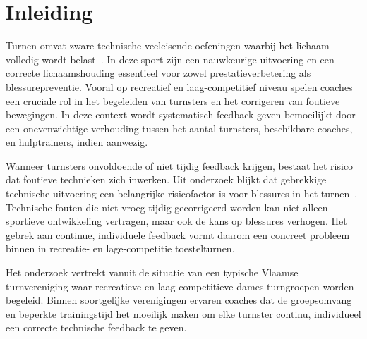 


% 

\section{Inleiding}%
\label{sec:inleiding}
Turnen omvat zware technische veeleisende oefeningen waarbij het lichaam volledig wordt belast~\autocite{ijms262210929}. In deze sport zijn een nauwkeurige uitvoering en een correcte lichaamshouding essentieel voor zowel prestatieverbetering als blessurepreventie. Vooral op recreatief en laag-com\-pe\-ti\-tief niveau spelen coaches een cruciale rol in het begeleiden van turnsters en het corrigeren van foutieve bewegingen. In deze context wordt systematisch feedback geven bemoeilijkt door een onevenwichtige verhouding tussen het aantal turnsters, beschikbare coaches, en hulptrainers, indien aanwezig.

Wanneer turnsters onvoldoende of niet tijdig feedback krijgen, bestaat het risico dat foutieve technieken zich inwerken. Uit onderzoek blijkt dat gebrekkige technische uitvoering een belangrijke risicofactor is voor blessures in het turnen~\autocite{ijms262210929}. Technische fouten die niet vroeg tijdig gecorrigeerd worden kan niet alleen sportieve ontwikkeling vertragen, maar ook de kans op blessures verhogen. Het gebrek aan continue, individuele feedback vormt daarom een concreet probleem binnen in recreatie- en lage-competitie toestelturnen.

Het onderzoek vertrekt vanuit de situatie van een typische Vlaamse turnvereniging waar recreatieve en laag-competitieve dames-turngroepen worden begeleid. Binnen soortgelijke verenigingen ervaren coaches dat de groepsomvang en beperkte trainingstijd het moeilijk maken om elke turnster continu, individueel een correcte technische feedback te geven. 

